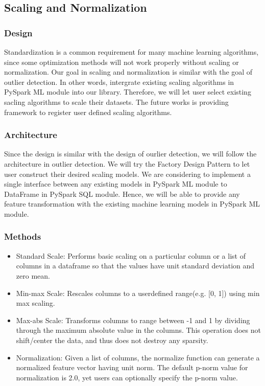 \documentclass[sigconf]{acmart}
\begin{document}
\subsection{Scaling and Normalization}
\subsubsection{Design}
Standardization is a common requirement for many machine learning algorithms, since some optimization methods will not work properly without scaling or normalization\cite{convex}. Our goal in scaling and normalization is similar with the goal of outlier detection. In other words, intergrate existing scaling algorithms in PySpark ML module into our library. Therefore, we will let user select existing sacling algorithms to scale their datasets. The future works is providing framework to register user defined scaling algorithms.

\subsubsection{Architecture}
Since the design is similar with the design of ourlier detection, we will follow the architecture in outlier detection. We will try the Factory Design Pattern to let user construct their desired scaling models. We are considering to implement a single interface between any existing models in PySpark ML module to DataFrame in PySpark SQL module. Hence, we will be able to provide any feature transformation with the existing machine learning models in PySpark ML module.

\subsubsection{Methods}
\begin{itemize}
	\item{Standard Scale}: Performs basic scaling on a particular column or a list of columns in a dataframe so that the values have unit standard deviation and zero mean. 
	\item{Min-max Scale}: Rescales columns to a user\-defined range(e.g. [0, 1]) using min max scaling.
	\item{Max-abs Scale}: Transforms columns to range between -1 and 1 by dividing through the maximum absolute value in the columns. This operation does not shift/center the data, and thus does not destroy any sparsity. 
	\item{Normalization}: Given a list of columns, the normalize function can generate a normalized feature vector having unit norm. The default p-norm value for normalization is 2.0, yet users can optionally specify the p-norm value.
\end{itemize}
\end{document}
